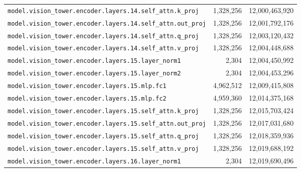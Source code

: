 \documentclass[10pt,a4paper]{article}
\theoremstyle{definition}
\begin{document}
\begin{appendices}
\begin{longtable}{p{9.5cm}rr}
\texttt{model.\allowbreak{}vision\_tower.\allowbreak{}encoder.\allowbreak{}layers.\allowbreak{}14.\allowbreak{}self\_attn.\allowbreak{}k\_proj} & 1,328,256 & 12,000,463,920 \\
\texttt{model.\allowbreak{}vision\_tower.\allowbreak{}encoder.\allowbreak{}layers.\allowbreak{}14.\allowbreak{}self\_attn.\allowbreak{}out\_proj} & 1,328,256 & 12,001,792,176 \\
\texttt{model.\allowbreak{}vision\_tower.\allowbreak{}encoder.\allowbreak{}layers.\allowbreak{}14.\allowbreak{}self\_attn.\allowbreak{}q\_proj} & 1,328,256 & 12,003,120,432 \\
\texttt{model.\allowbreak{}vision\_tower.\allowbreak{}encoder.\allowbreak{}layers.\allowbreak{}14.\allowbreak{}self\_attn.\allowbreak{}v\_proj} & 1,328,256 & 12,004,448,688 \\
\texttt{model.\allowbreak{}vision\_tower.\allowbreak{}encoder.\allowbreak{}layers.\allowbreak{}15.\allowbreak{}layer\_norm1} & 2,304 & 12,004,450,992 \\
\texttt{model.\allowbreak{}vision\_tower.\allowbreak{}encoder.\allowbreak{}layers.\allowbreak{}15.\allowbreak{}layer\_norm2} & 2,304 & 12,004,453,296 \\
\texttt{model.\allowbreak{}vision\_tower.\allowbreak{}encoder.\allowbreak{}layers.\allowbreak{}15.\allowbreak{}mlp.\allowbreak{}fc1} & 4,962,512 & 12,009,415,808 \\
\texttt{model.\allowbreak{}vision\_tower.\allowbreak{}encoder.\allowbreak{}layers.\allowbreak{}15.\allowbreak{}mlp.\allowbreak{}fc2} & 4,959,360 & 12,014,375,168 \\
\texttt{model.\allowbreak{}vision\_tower.\allowbreak{}encoder.\allowbreak{}layers.\allowbreak{}15.\allowbreak{}self\_attn.\allowbreak{}k\_proj} & 1,328,256 & 12,015,703,424 \\
\texttt{model.\allowbreak{}vision\_tower.\allowbreak{}encoder.\allowbreak{}layers.\allowbreak{}15.\allowbreak{}self\_attn.\allowbreak{}out\_proj} & 1,328,256 & 12,017,031,680 \\
\texttt{model.\allowbreak{}vision\_tower.\allowbreak{}encoder.\allowbreak{}layers.\allowbreak{}15.\allowbreak{}self\_attn.\allowbreak{}q\_proj} & 1,328,256 & 12,018,359,936 \\
\texttt{model.\allowbreak{}vision\_tower.\allowbreak{}encoder.\allowbreak{}layers.\allowbreak{}15.\allowbreak{}self\_attn.\allowbreak{}v\_proj} & 1,328,256 & 12,019,688,192 \\
\texttt{model.\allowbreak{}vision\_tower.\allowbreak{}encoder.\allowbreak{}layers.\allowbreak{}16.\allowbreak{}layer\_norm1} & 2,304 & 12,019,690,496 \\

\end{longtable}
\end{appendices}
\end{document}
